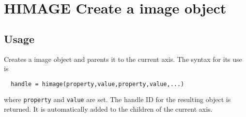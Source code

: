 \section{HIMAGE Create a image object}

\subsection{Usage}

Creates a image object and parents it to the current axis.  The
syntax for its use is 
\begin{verbatim}
  handle = himage(property,value,property,value,...)
\end{verbatim}
where \verb|property| and \verb|value| are set.  The handle ID for the
resulting object is returned.  It is automatically added to
the children of the current axis.
